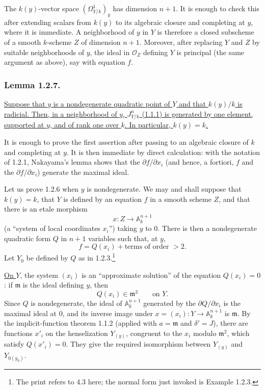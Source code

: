 The $k(y)$-vector space $(\Omega^1_{Y/k})_y$ has dimension $n+1$.
It is enough to check this after extending scalars from $k(y)$ to its
algebraic closure and completing at $y$, where it is immediate.  A
neighborhood of $y$ in $Y$ is therefore a closed subscheme of a
smooth $k$-scheme $Z$ of dimension $n+1$.  Moreover, after replacing
$Y$ and $Z$ by suitable neighborhoods of $y$, the ideal in
$\mathcal O_Z$ defining $Y$ is principal (the same argument as
above), say with equation $f$.

\subsubsection*{Lemma 1.2.7.}
\underline{Suppose that $y$ is a nondegenerate quadratic point of
$Y$ and that $k(y)/k$ is radicial.  Then, in a neighborhood of $y$,
$J^n_{Y/k}$ (1.1.1) is generated by one element, supported at $y$,
and of rank one over $k$.  In particular, $k(y)=k$.}

It is enough to prove the first assertion after passing to an
algebraic closure of $k$ and completing at $y$.  It is then immediate
by direct calculation: with the notation of 1.2.1, Nakayama's lemma
shows that the $\partial f/\partial x_i$ (and hence, a fortiori, $f$
and the $\partial f/\partial x_i$) generate the maximal ideal.

Let us prove 1.2.6 when $y$ is nondegenerate.  We may and shall
suppose that $k(y)=k$, that $Y$ is defined by an equation $f$ in a
smooth scheme $Z$, and that there is an etale morphism
\[
x:Z\longrightarrow\mathbb A_k^{n+1}
\]
(a ``system of local coordinates $x_i$'') taking $y$ to $0$.  There
is then a nondegenerate quadratic form $Q$ in $n+1$ variables such
that, at $y$,
\[
f=Q(x_i)+\text{terms of order }>2.
\]
Let $Y_0$ be defined by $Q$ as in 1.2.3.\footnote{The print refers to
4.3 here; the normal form just invoked is Example 1.2.3.}

\underline{On $Y$}, the system $(x_i)$ is an ``approximate solution''
of the equation $Q(x_i)=0$: if $\mathfrak m$ is the ideal defining
$y$, then
\[
Q(x_i)\in\mathfrak m^3\qquad\text{on }Y.
\]
Since $Q$ is nondegenerate, the ideal of $\mathbb A_k^{n+1}$
generated by the $\partial Q/\partial x_i$ is the maximal ideal at
$0$, and its inverse image under
$x=(x_i):Y\to\mathbb A_k^{n+1}$ is $\mathfrak m$.  By the
implicit-function theorem 1.1.2 (applied with $a=\mathfrak m$ and
$\delta'=J$), there are functions $x'_i$ on the henselization
$Y_{(y)}$, congruent to the $x_i$ modulo $\mathfrak m^2$, which
satisfy $Q(x'_i)=0$.  They give the required isomorphism between
$Y_{(y)}$ and $Y_{0(y_0)}$.

